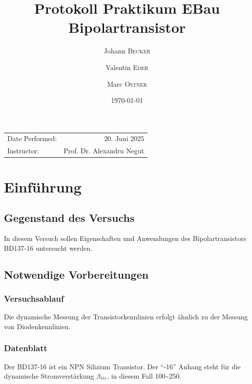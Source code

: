 \documentclass[
	a4paper, %
	12pt, %
]{CSUniSchoolLabReport}
\title{Protokoll Praktikum EBau Bipolartransistor} %
\author{Johann \textsc{Becker} \and Valentin \textsc{Eder} \and Marc \textsc{Ostner}}
\date{\today} %
\newcommand{\RNum}[1]{\uppercase\expandafter{\romannumeral #1\relax}}%
\begin{document}
\maketitle %


\begin{center}
	\begin{tabular}{l r}
		Date Performed: & 20. Juni 2025 \\ %
		
		Instructor: & Prof. Dr. Alexandru Negut %
	\end{tabular}
\end{center}



\section{Einführung}
\subsection{Gegenstand des Versuchs}
In diesem Versuch sollen Eigenschaften und Anwendungen des Bipolartransistors BD137-16 untersucht werden.
\subsection{Notwendige Vorbereitungen}
\subsubsection{Versuchsablauf}
Die dynamische Messung der Transistorkennlinien erfolgt ähnlich zu der Messung von Diodenkennlinien.
\subsubsection{Datenblatt}
Der BD137-16 ist ein NPN Silizium Transistor. 
Der ``-16'' Anhang steht für die dynamische Stromverstärkung $\beta_{\RNum{3}}$, in diesem Fall 100\textasciitilde 250. 
\end{document}
